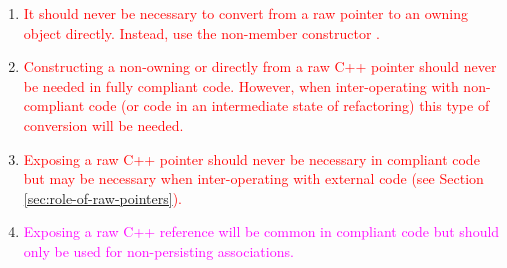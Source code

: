 {\begin{minipage}{\textwidth}
\begin{enumerate}
%
{}\item\label{conv:arcp-owning}\textcolor{red}{It should never be
necessary to convert from a raw pointer to an owning {}
object directly.  Instead, use the non-member constructor
{}.}
%
{}\item\label{conv:arcp-nonowning}\textcolor{red}{Constructing a
non-owning {} or {} directly from a raw
C++ pointer should never be needed in fully compliant code.  However,
when inter-operating with non-compliant code (or code in an intermediate
state of refactoring) this type of conversion will be needed.}
%
{}\item\label{conv:array-expose-raw-ptr}\textcolor{red}{Exposing a raw
C++ pointer should never be necessary in compliant code but may be
necessary when inter-operating with external code (see Section
{}\ref{sec:role-of-raw-pointers}).}
%
{}\item\label{conv:array-expose-raw-ref}\textcolor{magenta}{Exposing a
raw C++ reference will be common in compliant code but should only be
used for non-persisting associations.}
%
\end{enumerate}

\end{minipage}}
